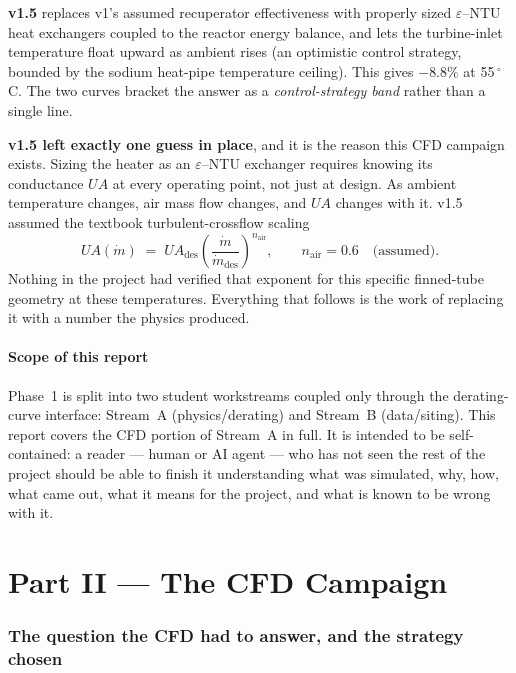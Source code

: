 \documentclass[11pt]{article}
\newcommand{\co}{$^\circ$C}
\newcommand{\mdot}{\dot m}
\begin{document}
\textbf{v1.5} replaces v1's assumed recuperator effectiveness with properly sized $\varepsilon$--NTU heat
exchangers coupled to the reactor energy balance, and lets the turbine-inlet temperature float upward as
ambient rises (an optimistic control strategy, bounded by the sodium heat-pipe temperature ceiling). This
gives $-8.8\%$ at 55\,\co. The two curves bracket the answer as a \emph{control-strategy band} rather than a
single line.

\textbf{v1.5 left exactly one guess in place}, and it is the reason this CFD campaign exists. Sizing the
heater as an $\varepsilon$--NTU exchanger requires knowing its conductance $UA$ at every operating point, not
just at design. As ambient temperature changes, air mass flow changes, and $UA$ changes with it. v1.5 assumed
the textbook turbulent-crossflow scaling
\begin{equation}
UA(\mdot) \;=\; UA_\mathrm{des}\left(\frac{\mdot}{\mdot_\mathrm{des}}\right)^{\!n_\mathrm{air}},
\qquad n_\mathrm{air}=0.6 \quad\text{(assumed)}.
\label{eq:v15law}
\end{equation}
Nothing in the project had verified that exponent for this specific finned-tube geometry at these
temperatures. Everything that follows is the work of replacing it with a number the physics produced.

\subsection{Scope of this report}

Phase~1 is split into two student workstreams coupled only through the derating-curve interface: Stream~A
(physics/derating) and Stream~B (data/siting). This report covers the CFD portion of Stream~A in full. It is
intended to be self-contained: a reader --- human or AI agent --- who has not seen the rest of the project
should be able to finish it understanding what was simulated, why, how, what came out, what it means for the
project, and what is known to be wrong with it.

\clearpage
\part*{Part II --- The CFD Campaign}

\section{The question the CFD had to answer, and the strategy chosen}
\end{document}
